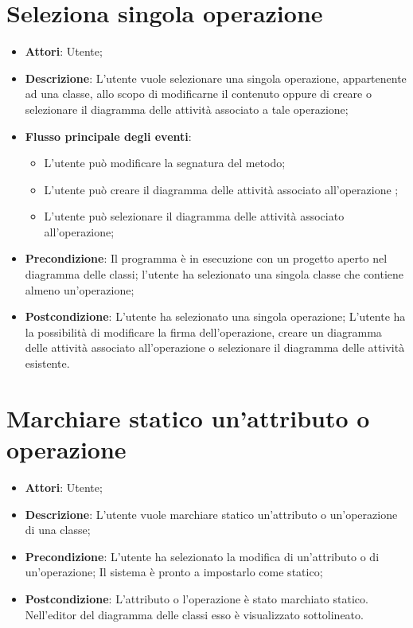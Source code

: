 \documentclass[../AnalisiDeiRequisiti.tex]{subfiles}
\begin{document}
	\section{Seleziona singola operazione}
	\begin{itemize}
		\item \textbf{Attori}: Utente;
		\item \textbf{Descrizione}: L'utente vuole selezionare una singola operazione, appartenente ad una classe,  allo scopo di modificarne il contenuto oppure di creare o selezionare il diagramma delle attività associato a tale operazione;
		\item \textbf{Flusso principale degli eventi}: 
		\begin{itemize}
		\item L'utente può modificare la segnatura del metodo;
		\item L'utente può creare il diagramma delle attività associato all'operazione ;
		\item L'utente può selezionare il diagramma delle attività associato all'operazione;
		\end{itemize}
		\item \textbf{Precondizione}: Il programma è in esecuzione con un progetto aperto nel diagramma delle classi; l'utente ha selezionato una singola classe che contiene almeno un'operazione; 
		\item \textbf{Postcondizione}: L'utente ha selezionato una singola operazione; L'utente ha la possibilità di modificare la firma dell'operazione, creare un diagramma delle attività associato all'operazione o selezionare il diagramma delle attività esistente.
	\end{itemize}	

	\section{Marchiare statico un'attributo o operazione}
	\begin{itemize}
		\item \textbf{Attori}: Utente;
		\item \textbf{Descrizione}: L'utente vuole marchiare statico un'attributo o un'operazione di una classe;
		\item \textbf{Precondizione}: L'utente ha selezionato la modifica di un'attributo o di un'operazione; Il sistema è pronto a impostarlo come statico;
		\item \textbf{Postcondizione}: L'attributo o l'operazione è stato marchiato statico. Nell'editor del diagramma delle classi esso è visualizzato sottolineato.
	\end{itemize}		
			
\end{document}
